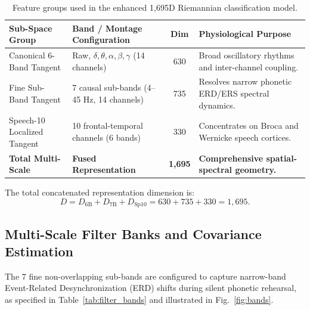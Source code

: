 \documentclass[10pt,twocolumn,a4paper]{article}
\begin{document}
\begin{table}[H]
\centering
\caption{Feature groups used in the enhanced 1,695D Riemannian classification model.}
\label{tab:feature_groups}
\small
\begin{tabular}{p{2.3cm} p{2.2cm} c p{2.1cm}}
\toprule
\textbf{Sub-Space Group} & \textbf{Band / Montage Configuration} & \textbf{Dim} & \textbf{Physiological Purpose} \\
\midrule
Canonical 6-Band Tangent & Raw, $\delta, \theta, \alpha, \beta, \gamma$ (14 channels) & 630 & Broad oscillatory rhythms and inter-channel coupling. \\
Fine Sub-Band Tangent & 7 causal sub-bands (4--45 Hz, 14 channels) & 735 & Resolves narrow phonetic ERD/ERS spectral dynamics. \\
Speech-10 Localized Tangent & 10 frontal-temporal channels (6 bands) & 330 & Concentrates on Broca and Wernicke speech cortices. \\
\midrule
\textbf{Total Multi-Scale} & \textbf{Fused Representation} & \textbf{1,695} & \textbf{Comprehensive spatial-spectral geometry.} \\
\bottomrule
\end{tabular}
\end{table}

The total concatenated representation dimension is:
\begin{equation}
D = D_{\text{6B}} + D_{\text{7B}} + D_{\text{Sp10}} = 630 + 735 + 330 = 1,695.
\label{eq:dim_total}
\end{equation}

\subsection{Multi-Scale Filter Banks and Covariance Estimation}
The 7 fine non-overlapping sub-bands are configured to capture narrow-band Event-Related Desynchronization (ERD) shifts during silent phonetic rehearsal, as specified in Table~\ref{tab:filter_bands} and illustrated in Fig.~\ref{fig:bands}.
\end{document}
